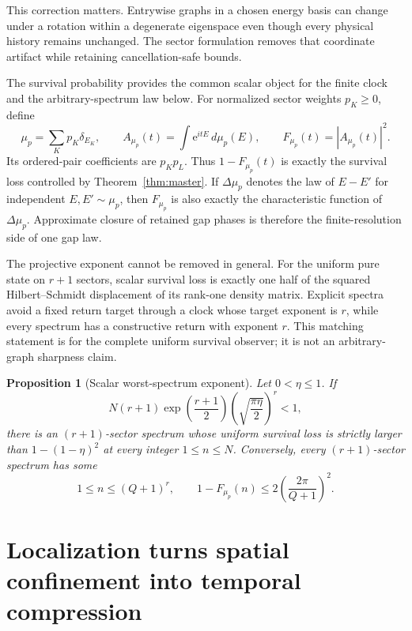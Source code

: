 \documentclass[10pt]{article}
\newtheorem{proposition}[theorem]{Proposition}
\theoremstyle{definition}
\newcommand{\ee}{\mathrm e}
\begin{document}
This correction matters. Entrywise graphs in a chosen energy basis can
change under a rotation within a degenerate eigenspace even though every
physical history remains unchanged. The sector formulation removes that
coordinate artifact while retaining cancellation-safe bounds.

The survival probability provides the common scalar object for the finite
clock and the arbitrary-spectrum law below. For normalized sector weights
\(p_K\ge0\), define
\begin{equation}
 \mu_p=\sum_Kp_K\delta_{E_K},\qquad
 A_{\mu_p}(t)=\int\ee^{itE}\,d\mu_p(E),\qquad
 F_{\mu_p}(t)=|A_{\mu_p}(t)|^2.
 \label{eq:fidelity-measure}
\end{equation}
Its ordered-pair coefficients are \(p_Kp_L\). Thus
\(1-F_{\mu_p}(t)\) is exactly the survival loss controlled by
Theorem~\ref{thm:master}. If \(\Delta\mu_p\) denotes the law of \(E-E'\) for
independent \(E,E'\sim\mu_p\), then \(F_{\mu_p}\) is also exactly the
characteristic function of \(\Delta\mu_p\). Approximate closure of retained
gap phases is therefore the finite-resolution side of one gap law.

The projective exponent cannot be removed in general. For the uniform pure
state on \(r+1\) sectors, scalar survival loss is exactly one half of the
squared Hilbert--Schmidt displacement of its rank-one density matrix.
Explicit spectra avoid a fixed return target through a clock whose
target exponent is \(r\), while every spectrum has a constructive return
with exponent \(r\). This matching statement is for the complete uniform
survival observer; it is not an arbitrary-graph sharpness claim.

\begin{proposition}[Scalar worst-spectrum exponent]
\label{prop:sharp}
Let \(0<\eta\le1\). If
\[
 N(r+1)\exp\!\left(\frac{r+1}{2}\right)
 \left(\sqrt{\frac{\pi\eta}{2}}\right)^r<1,
\]
there is an \((r+1)\)-sector spectrum whose uniform survival loss is
strictly larger than \(1-(1-\eta)^2\) at every integer
\(1\le n\le N\). Conversely, every \((r+1)\)-sector spectrum has some
\[
 1\le n\le(Q+1)^r,\qquad
 1-F_{\mu_p}(n)\le
 2\left(\frac{2\pi}{Q+1}\right)^2.
\]
\end{proposition}

\section*{Localization turns spatial confinement into temporal compression}
\end{document}

